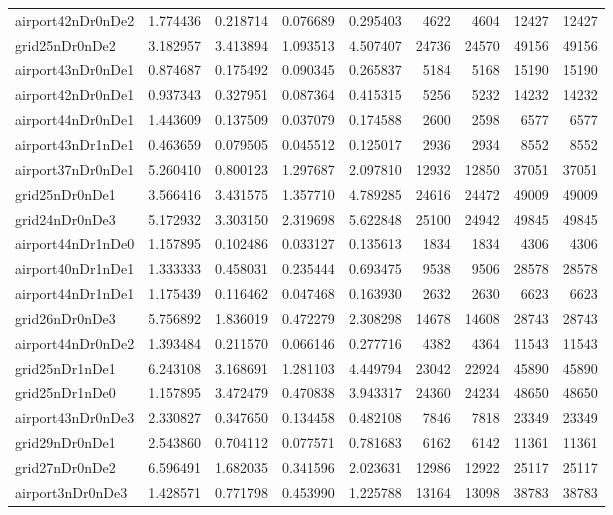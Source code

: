 \begin{longtable}{|l|r|r|r|r|r|r|r|r|}
airport42nDr0nDe2 & 1.774436 & 0.218714 & 0.076689 & 0.295403 & 4622 & 4604 & 12427 & 12427 \\
grid25nDr0nDe2 & 3.182957 & 3.413894 & 1.093513 & 4.507407 & 24736 & 24570 & 49156 & 49156 \\
airport43nDr0nDe1 & 0.874687 & 0.175492 & 0.090345 & 0.265837 & 5184 & 5168 & 15190 & 15190 \\
airport42nDr0nDe1 & 0.937343 & 0.327951 & 0.087364 & 0.415315 & 5256 & 5232 & 14232 & 14232 \\
airport44nDr0nDe1 & 1.443609 & 0.137509 & 0.037079 & 0.174588 & 2600 & 2598 & 6577 & 6577 \\
airport43nDr1nDe1 & 0.463659 & 0.079505 & 0.045512 & 0.125017 & 2936 & 2934 & 8552 & 8552 \\
airport37nDr0nDe1 & 5.260410 & 0.800123 & 1.297687 & 2.097810 & 12932 & 12850 & 37051 & 37051 \\
grid25nDr0nDe1 & 3.566416 & 3.431575 & 1.357710 & 4.789285 & 24616 & 24472 & 49009 & 49009 \\
grid24nDr0nDe3 & 5.172932 & 3.303150 & 2.319698 & 5.622848 & 25100 & 24942 & 49845 & 49845 \\
airport44nDr1nDe0 & 1.157895 & 0.102486 & 0.033127 & 0.135613 & 1834 & 1834 & 4306 & 4306 \\
airport40nDr1nDe1 & 1.333333 & 0.458031 & 0.235444 & 0.693475 & 9538 & 9506 & 28578 & 28578 \\
airport44nDr1nDe1 & 1.175439 & 0.116462 & 0.047468 & 0.163930 & 2632 & 2630 & 6623 & 6623 \\
grid26nDr0nDe3 & 5.756892 & 1.836019 & 0.472279 & 2.308298 & 14678 & 14608 & 28743 & 28743 \\
airport44nDr0nDe2 & 1.393484 & 0.211570 & 0.066146 & 0.277716 & 4382 & 4364 & 11543 & 11543 \\
grid25nDr1nDe1 & 6.243108 & 3.168691 & 1.281103 & 4.449794 & 23042 & 22924 & 45890 & 45890 \\
grid25nDr1nDe0 & 1.157895 & 3.472479 & 0.470838 & 3.943317 & 24360 & 24234 & 48650 & 48650 \\
airport43nDr0nDe3 & 2.330827 & 0.347650 & 0.134458 & 0.482108 & 7846 & 7818 & 23349 & 23349 \\
grid29nDr0nDe1 & 2.543860 & 0.704112 & 0.077571 & 0.781683 & 6162 & 6142 & 11361 & 11361 \\
grid27nDr0nDe2 & 6.596491 & 1.682035 & 0.341596 & 2.023631 & 12986 & 12922 & 25117 & 25117 \\
airport3nDr0nDe3 & 1.428571 & 0.771798 & 0.453990 & 1.225788 & 13164 & 13098 & 38783 & 38783 \\

\end{longtable}
